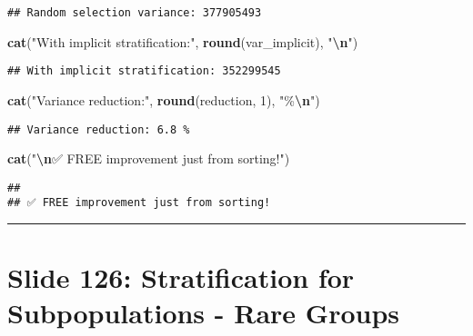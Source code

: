 \documentclass[
]{article}
\newenvironment{Shaded}{\begin{snugshade}}{\end{snugshade}}
\newcommand{\DecValTok}[1]{\textcolor[rgb]{0.00,0.00,0.81}{#1}}
\newcommand{\FunctionTok}[1]{\textcolor[rgb]{0.13,0.29,0.53}{\textbf{#1}}}
\newcommand{\NormalTok}[1]{#1}
\newcommand{\SpecialCharTok}[1]{\textcolor[rgb]{0.81,0.36,0.00}{\textbf{#1}}}
\newcommand{\StringTok}[1]{\textcolor[rgb]{0.31,0.60,0.02}{#1}}
\begin{document}
\begin{verbatim}
## Random selection variance: 377905493
\end{verbatim}

\begin{Shaded}
\begin{Highlighting}[]
\FunctionTok{cat}\NormalTok{(}\StringTok{"With implicit stratification:"}\NormalTok{, }\FunctionTok{round}\NormalTok{(var\_implicit), }\StringTok{"}\SpecialCharTok{\textbackslash{}n}\StringTok{"}\NormalTok{)}
\end{Highlighting}
\end{Shaded}

\begin{verbatim}
## With implicit stratification: 352299545
\end{verbatim}

\begin{Shaded}
\begin{Highlighting}[]
\FunctionTok{cat}\NormalTok{(}\StringTok{"Variance reduction:"}\NormalTok{, }\FunctionTok{round}\NormalTok{(reduction, }\DecValTok{1}\NormalTok{), }\StringTok{"\%}\SpecialCharTok{\textbackslash{}n}\StringTok{"}\NormalTok{)}
\end{Highlighting}
\end{Shaded}

\begin{verbatim}
## Variance reduction: 6.8 %
\end{verbatim}

\begin{Shaded}
\begin{Highlighting}[]
\FunctionTok{cat}\NormalTok{(}\StringTok{"}\SpecialCharTok{\textbackslash{}n}\StringTok{✅ FREE improvement just from sorting!"}\NormalTok{)}
\end{Highlighting}
\end{Shaded}

\begin{verbatim}
## 
## ✅ FREE improvement just from sorting!
\end{verbatim}

\begin{center}\rule{0.5\linewidth}{0.5pt}\end{center}

\section{Slide 126: Stratification for Subpopulations - Rare
Groups}\label{slide-126-stratification-for-subpopulations---rare-groups}
\end{document}
